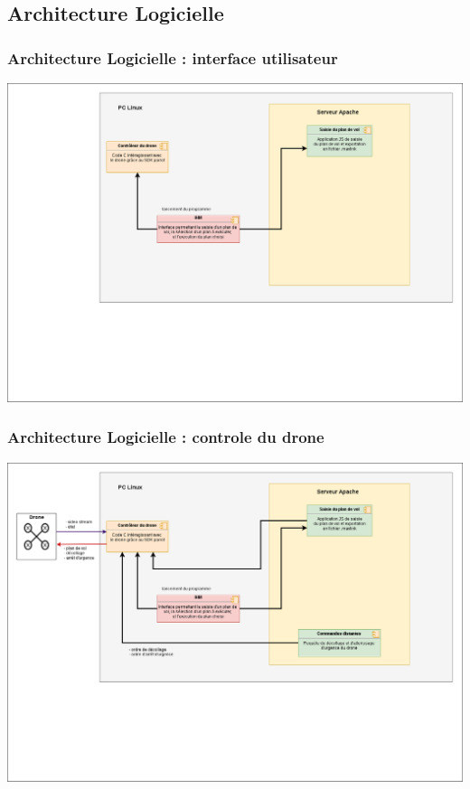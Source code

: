 \documentclass{beamer}
\begin{document}


	\begin{frame}
	\section{Architecture Logicielle}
		\begin{center}
		\frametitle{Architecture Logicielle : interface utilisateur}

       
        \includegraphics[scale=0.24]{01_archi_logicielle_IHM.png}
		\end{center}
	\end{frame}
	


	\begin{frame}
		
		\begin{center}
		\frametitle{Architecture Logicielle : controle du drone}

       
        \includegraphics[scale=0.24]{02_archi_logicielle_controle_drone.png}
		\end{center}
	\end{frame}
	
\end{document}
